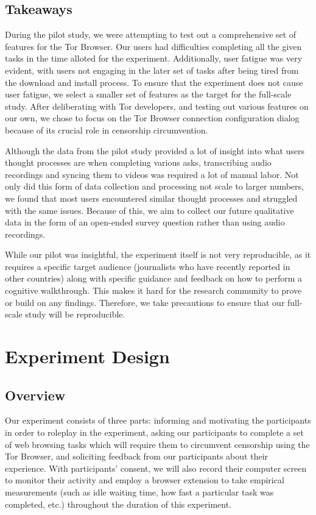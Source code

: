\documentclass[letterpaper,twocolumn,11pt]{article}
\begin{document}
\subsection{Takeaways} 
\indent \indent During the pilot study, we were attempting to test out a comprehensive set of 
features for the Tor Browser. Our users had difficulties completing all the given tasks in the 
time alloted for the experiment. Additionally, user fatigue was very evident, with users not 
engaging in the later set of tasks after being tired from the download and install process. 
To ensure that the experiment does not cause user fatigue, we select a smaller set of features 
as the target for the full-scale study.  After deliberating with Tor developers, and testing out
various features on our own, we chose to focus on the Tor Browser connection configuration 
dialog because of its crucial role in censorship circumvention. 

Although the data from the pilot study provided a lot of insight into what users thought processes
are when completing various asks, transcribing audio recordings and syncing them to videos was
required a lot of manual labor. Not only did this form of data collection and processing not scale 
to larger numbers, we found that most users encountered similar thought processes and struggled
with the same issues. Because of this, we aim to collect our future qualitative data in the form of 
an open-ended survey question rather than using audio recordings. 

While our pilot was insightful, the experiment itself is not very reproducible, as it requires
a specific target audience (journalists who have recently reported in other countries) along 
with specific guidance and feedback on how to perform a cognitive walkthrough. This makes it hard
for the research community to prove or build on any findings. Therefore, we take precautions
to ensure that our full-scale study will be reproducible. 

\section{Experiment Design}

\subsection{Overview} 
Our experiment consists of three parts: informing and motivating the participants in order 
to roleplay in the experiment, asking our participants to complete a set of web browsing tasks which will 
require them to circumvent censorship using the Tor Browser, and soliciting feedback from our participants
about their experience. With participants' consent, we will also record their computer screen to monitor 
their activity and employ a browser extension to take empirical measurements (such as idle waiting time, 
how fast a particular task was completed, etc.) throughout the duration of this experiment. 
\end{document}
